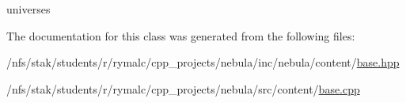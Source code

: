 universes 

The documentation for this class was generated from the following files:\begin{DoxyCompactItemize}
\item 
/nfs/stak/students/r/rymalc/cpp\_\-projects/nebula/inc/nebula/content/\hyperlink{inc_2nebula_2content_2base_8hpp}{base.hpp}\item 
/nfs/stak/students/r/rymalc/cpp\_\-projects/nebula/src/content/\hyperlink{src_2content_2base_8cpp}{base.cpp}\end{DoxyCompactItemize}
